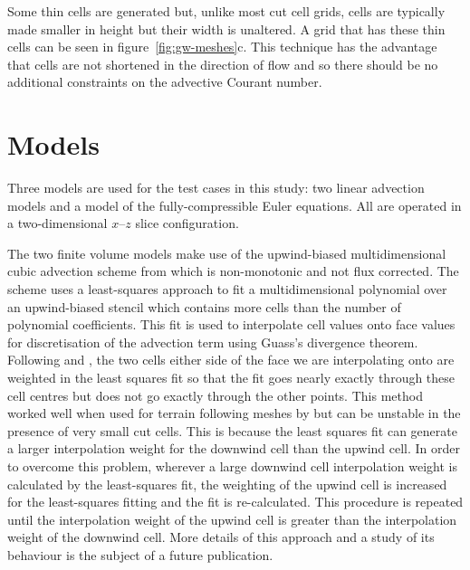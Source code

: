 \documentclass{ametsoc}
\begin{document}
Some thin cells are generated but, unlike most cut cell grids, cells are typically made smaller in height but their width is unaltered.  A grid that has these thin cells can be seen in figure~\ref{fig:gw-meshes}c.  This technique has the advantage that cells are not shortened in the direction of flow and so there should be no additional constraints on the advective Courant number.


\section{Models}
\label{sec:model}
Three models are used for the test cases in this study: two linear advection models and a model of the fully-compressible Euler equations.  All are operated in a two-dimensional $x$--$z$ slice configuration.  

The two finite volume models make use of the upwind-biased multidimensional cubic advection scheme from \citet{weller-shahrokhi2014} which is non-monotonic and not flux corrected.  
The scheme uses a least-squares approach to fit a multidimensional polynomial over an upwind-biased stencil which contains more cells than the number of polynomial coefficients.
This fit is used to interpolate cell values onto face values for discretisation of the advection term using Guass's divergence theorem.
Following \cite{lashley2002} and \cite{weller2009},  the two cells either side of the face we are interpolating onto are weighted in the least squares fit so that the fit goes nearly exactly through these cell centres but does not go exactly through the other points.
This method worked well when used for terrain following meshes by \citet{weller-shahrokhi2014} but can be unstable in the presence of very small cut cells. This is because the least squares fit can generate a larger interpolation weight for the downwind cell than the upwind cell. In order to overcome this problem, wherever a large downwind cell interpolation weight is calculated by the least-squares fit, the weighting of the upwind cell is increased for the least-squares fitting and the fit is re-calculated.
This procedure is repeated until the interpolation weight of the upwind cell is greater than the interpolation weight of the downwind cell. More details of this approach and a study of its behaviour is the subject of a future publication. 
\end{document}
